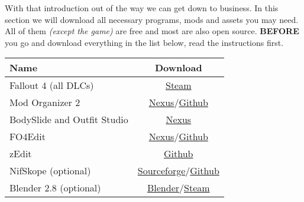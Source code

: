 With that introduction out of the way we can get down to business. In this section we will download all necessary 
programs, mods and assets you may need. All of them \textit{(except the game)} are free and most 
are also open source. \textbf{BEFORE} you go and download everything in the list below, read the instructions first.
\begin{center}
\vspace{0.5cm}
\begin{tabular}{| p{} | c |}
    Name & Download \\ [1ex]
    \hline
    Fallout 4 (all DLCs) & \href{https://store.steampowered.com/app/377160/Fallout_4/}{Steam}  \\ [1ex]
    Mod Organizer 2 & \href{https://www.nexusmods.com/skyrimspecialedition/mods/6194}{Nexus}/\href{https://github.com/ModOrganizer2/modorganizer/releases}{Github} \\ [1ex]
    BodySlide and Outfit Studio & \href{https://www.nexusmods.com/fallout4/mods/25}{Nexus} \\ [1ex]
    FO4Edit & \href{https://www.nexusmods.com/fallout4/mods/2737}{Nexus}/\href{https://github.com/TES5Edit/TES5Edit/releases}{Github} \\ [1ex]
    zEdit & \href{https://github.com/z-edit/zedit/releases}{Github} \\ [1ex]
    NifSkope (optional) & \href{http://niftools.sourceforge.net/wiki/NifSkope}{Sourceforge}/\href{https://github.com/niftools/nifskope/releases}{Github} \\ [1ex]
    Blender 2.8 (optional) & \href{https://www.blender.org/download/}{Blender}/\href{https://store.steampowered.com/app/365670/Blender/}{Steam} \\ [1ex]
\end{tabular}
\vspace{0.5cm}
\end{center}

